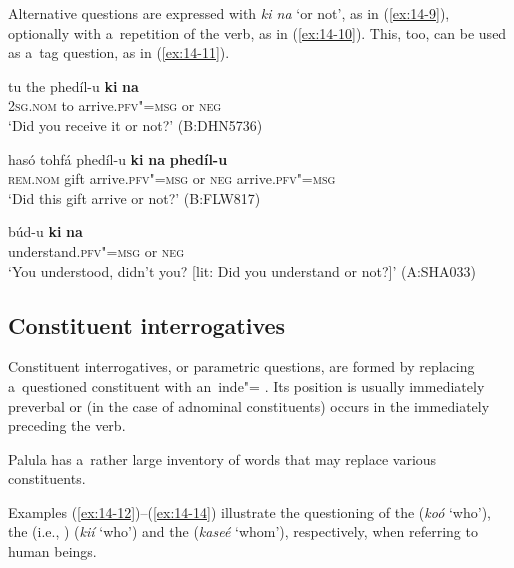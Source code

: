Alternative questions are expressed with \textit{ki na} `or not', as in (\ref{ex:14-9}), optionally with a~repetition of the verb, as in (\ref{ex:14-10}). This, too, can be used as a~tag question, as in (\ref{ex:14-11}).

\begin{exe}
\ex
\label{ex:14-9}
\gll tu the phedíl-u \textbf{ki} \textbf{na} \\
\textsc{2sg.nom} to arrive.\textsc{pfv"=msg} or \textsc{neg} \\
\glt `Did you receive it or not?' (B:DHN5736)

\ex
\label{ex:14-10}
\gll hasó tohfá phedíl-u \textbf{ki} \textbf{na} \textbf{phedíl-u}  \\
\textsc{rem.nom} gift arrive.\textsc{pfv"=msg} or \textsc{neg}  arrive.\textsc{pfv"=msg} \\
\glt `Did this gift arrive or not?' (B:FLW817)

\ex
\label{ex:14-11}
\gll búd-u \textbf{ki} \textbf{na} \\
understand.\textsc{pfv"=msg} or \textsc{neg} \\
\glt `You understood, didn't you? [lit: Did you understand or not?]' (A:SHA033)
\end{exe}
\subsection{Constituent interrogatives}
\label{subsec:14-2-2}

Constituent interrogatives, or parametric questions, are formed by replacing a~questioned constituent with an~inde"= . Its position is usually immediately preverbal or (in the case of adnominal constituents) occurs in the  immediately preceding the verb.


Palula has a~rather large inventory of  words that may replace various constituents.


 Examples (\ref{ex:14-12})--(\ref{ex:14-14}) illustrate the questioning of the   (\textit{koó} `who'), the  (i.e., )  (\textit{kií} `who') and the   (\textit{kaseé} `whom'), respectively, when referring to human beings.

